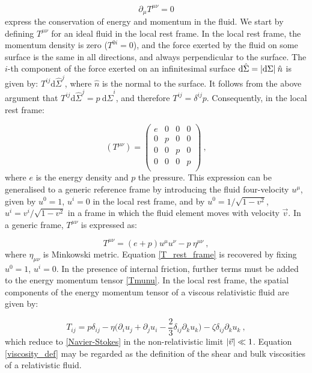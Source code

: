 \begin{equation}
\partial_{\mu} T^{\mu\nu} = 0
\end{equation}
%
express the conservation of energy and momentum in the fluid.
We start by defining $T^{\mu\nu}$ for an ideal fluid in the local rest frame. In the local rest frame, the momentum density is zero ($T^{0i} = 0$), and the force exerted by the fluid on some surface is the same in all directions, and always perpendicular to the surface. The $i$-th component of the force exerted on an infinitesimal surface $\mathrm{d} \hat \Sigma = \abs{\mathrm{d}\Sigma} \: \hat n$ is given by:  $T^{ij} \mathrm{d} \hat \Sigma^j $, where $\hat n$ is the normal to the surface. It follows from the above argument that $T^{ij} \mathrm{d} \hat \Sigma^j = p \: \mathrm{d} \hat \Sigma^i $, and therefore $T^{ij} = \delta^{ij} p$. Consequently, in the local rest frame:
 
 
 \begin{equation}
 (T^{\mu\nu}) =
 \begin{pmatrix}
 e & 0 & 0 & 0 \\
 0 & p & 0 & 0 \\
 0 & 0 & p & 0 \\
 0 & 0 & 0 & p \\
 \end{pmatrix} \: ,
 \label{T_rest_frame}
 \end{equation}
 where $e$ is the energy density and $p$ the pressure.
 This expression can be generalised to a generic reference frame by introducing the fluid four-velocity $u^{\mu}$, given by $u^0 =1$, $u^i =0$ in the local rest frame, and by $u^0 = 1/\sqrt{1-v^2}$, $u^i = v^i/\sqrt{1-v^2}$ in a frame in which the fluid element moves with velocity $\vec v$. In a generic frame, $T^{\mu\nu}$ is expressed as:
 
 \begin{equation}
 T^{\mu\nu} = (e+p) u^{\mu} u^{\nu} - p \: \eta^{\mu\nu} \: ,
 \label{Tmunu}
 \end{equation}
 where $\eta_{\mu\nu}$ is Minkowski metric. Equation \ref{T_rest_frame} is recovered by fixing $u^0 =1$, $u^i =0$.
In the presence of internal friction, further terms must be added to the energy momentum tensor \ref{Tmunu}. In the local rest frame, the spatial components of the energy momentum tensor of a viscous relativistic fluid are given by:

\begin{equation}
T_{ij} = p \delta_{ij} - \eta \biggl( \partial_i u_j +\partial_j u_i - \frac{2}{3} \delta_{ij} \partial_k u_k \biggr) - \zeta \delta_{ij} \partial_k u_k \: ,
\label{viscosity_def}
\end{equation}
%
which reduce to \ref{Navier-Stokes} in the non-relativistic limit $\abs{\vec v} \ll 1$. Equation \ref{viscosity_def} may be regarded as the definition of the shear and bulk viscosities of a relativistic fluid.
 
